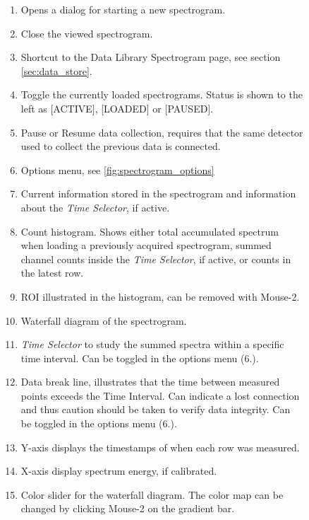 \begin{figure}[H]
    \begin{flushleft}
        \begin{enumerate}
            \item Opens a dialog for starting a new spectrogram.
            \item Close the viewed spectrogram.
            \item Shortcut to the Data Library Spectrogram page, see section \ref{sec:data_store}.
            \item Toggle the currently loaded spectrograms. Status is shown to the left as [ACTIVE], [LOADED] or [PAUSED].
            \item Pause or Resume data collection, requires that the same detector used to collect the previous data is connected.
            \item Options menu, see \autoref{fig:spectrogram_options}
            \item Current information stored in the spectrogram and information about the \textit{Time Selector}, if active.
            \item Count histogram. Shows either total accumulated spectrum when loading a previously acquired spectrogram, summed channel counts inside the \textit{Time Selector}, if active, or counts in the latest row.
            \item ROI illustrated in the histogram, can be removed with Mouse-2.
            \item Waterfall diagram of the spectrogram.
            \item \textit{Time Selector} to study the summed spectra within a specific time interval. Can be toggled in the options menu (6.).
            \item Data break line, illustrates that the time between measured points exceeds the Time Interval. Can indicate a lost connection and thus caution should be taken to verify data integrity. Can be toggled in the options menu (6.).
            \item Y-axis displays the timestamps of when each row was measured.
            \item X-axis display spectrum energy, if calibrated.
            \item Color slider for the waterfall diagram. The color map can be changed by clicking Mouse-2 on the gradient bar.
        \end{enumerate}
    \end{flushleft}
\end{figure}

